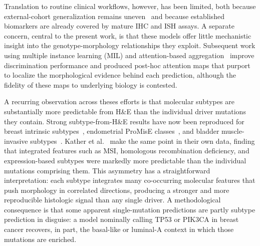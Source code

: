 Translation to routine clinical workflows, however, has been limited, both because external-cohort generalization remains uneven~\cite{niehuesGeneralizableBiomarkerPrediction2023} and because established biomarkers are already covered by mature IHC and ISH assays. 
A separate concern, central to the present work, is that these models offer little mechanistic insight into the genotype-morphology relationships they exploit.
Subsequent work using multiple instance learning (MIL) and attention-based aggregation~\cite{ilseAttentionbasedDeepMultiple2018, luDataefficientWeaklySupervised2021} improve discrimination performance and produced post-hoc attention maps that purport to localize the morphological evidence behind each prediction, although the fidelity of these maps to underlying biology is contested.

A recurring observation across theses efforts is that molecular subtypes are substantially more predictable from H\&E than the individual driver mutations they contain.
Strong subtype-from-H\&E results have now been reproduced for breast intrinsic subtypes~\cite{coutureImageAnalysisDeep2018, jaberDeepLearningImagebased2020}, endometrial ProMisE classes~\cite{fremondInterpretableDeepLearning2023}, and bladder muscle-invasive subtypes~\cite{woerlDeepLearningPredicts2020}.
Kather et al.~\cite{katherPancancerImagebasedDetection2020} make the same point in their own data, finding that integrated features such as MSI, homologous recombination deficiency, and expression-based subtypes were markedly more predictable than the individual mutations comprising them.
This asymmetry has a straightforward interpretation: each subtype integrates many co-occurring molecular features that push morphology in correlated directions, producing a stronger and more reproducible histologic signal than any single driver. 
A methodological consequence is that some apparent single-mutation predictions are partly subtype prediction in disguise: a model nominally calling TP53 or PIK3CA in breast cancer recovers, in part, the basal-like or luminal-A context in which those mutations are enriched.

